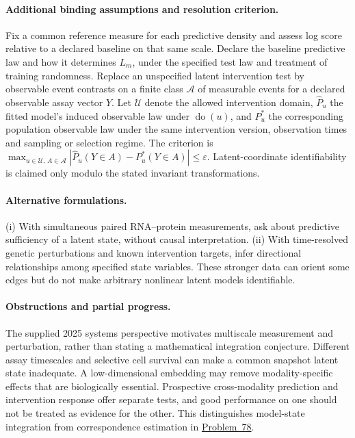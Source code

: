 \documentclass[11pt]{article}
\begin{document}
\paragraph{Additional binding assumptions and resolution criterion.} Fix a common reference measure for each predictive density and assess log score relative to a declared baseline on that same scale. Declare the baseline predictive law and how it determines $L_m$, under the specified test law and treatment of training randomness. Replace an unspecified latent intervention test by observable event contrasts on a finite class $\mathcal A$ of measurable events for a declared observable assay vector $Y$. Let $\mathcal U$ denote the allowed intervention domain, $\widehat P_u$ the fitted model's induced observable law under $\operatorname{do}(u)$, and $P_u^*$ the corresponding population observable law under the same intervention version, observation times and sampling or selection regime. The criterion is $\max_{u\in\mathcal U,\,A\in\mathcal A}|\widehat P_u(Y\in A)-P_u^*(Y\in A)|\leq\varepsilon$. Latent-coordinate identifiability is claimed only modulo the stated invariant transformations.

\paragraph{Alternative formulations.} (i) With simultaneous paired RNA--protein measurements, ask about predictive sufficiency of a latent state, without causal interpretation. (ii) With time-resolved genetic perturbations and known intervention targets, infer directional relationships among specified state variables. These stronger data can orient some edges but do not make arbitrary nonlinear latent models identifiable.
\paragraph{Obstructions and partial progress.} The supplied 2025 systems perspective motivates multiscale measurement and perturbation, rather than stating a mathematical integration conjecture. Different assay timescales and selective cell survival can make a common snapshot latent state inadequate. A low-dimensional embedding may remove modality-specific effects that are biologically essential. Prospective cross-modality prediction and intervention response offer separate tests, and good performance on one should not be treated as evidence for the other. This distinguishes model-state integration from correspondence estimation in \href{https://we-solve.github.io/problems/cross-modal-biological-alignment-ea4a0eab/}{Problem~78}.
\end{document}
